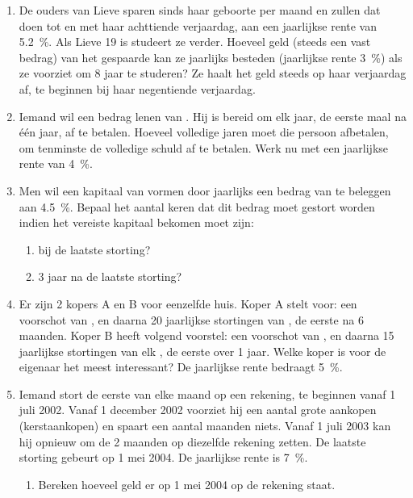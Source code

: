 \begin{enumerate}
   
    \item De ouders van Lieve sparen sinds haar geboorte
     per maand en zullen dat doen tot en met haar
    achttiende verjaardag, aan een jaarlijkse rente van
    \SI{5,2}{\percent}. Als Lieve 19 is studeert ze verder. Hoeveel geld (steeds 
    een vast bedrag) van
    het gespaarde kan ze jaarlijks besteden (jaarlijkse rente \SI{3}{\percent}) als ze  voorziet om 8 jaar te studeren? Ze haalt het geld steeds op haar verjaardag af, te beginnen bij haar negentiende verjaardag.

    \item  Iemand wil een bedrag lenen van . Hij is bereid
   om elk jaar, de eerste maal na \'{e}\'{e}n jaar, 
   af te betalen.
Hoeveel volledige jaren moet die persoon  afbetalen,
       om tenminste de volledige schuld af te betalen. Werk
       nu met een jaarlijkse rente van \SI{4}{\percent}.


    \item Men wil een kapitaal van  vormen door jaarlijks
    een bedrag van  te beleggen aan \SI{4,5}{\percent}. Bepaal het aantal
    keren dat dit bedrag moet gestort worden indien het vereiste
    kapitaal bekomen moet zijn:
    \begin{enumerate}
    \item bij de laatste storting?
    \item 3 jaar na de laatste storting?
    \end{enumerate}

    \item  Er zijn 2 kopers A en B voor eenzelfde huis. Koper A stelt 
    voor:  een voorschot van , en daarna 20 jaarlijkse 
    stortingen van
    , de eerste na 6 maanden. Koper B heeft volgend 
    voorstel: een voorschot van 
    , en daarna 15 jaarlijkse stortingen van elk
    , de eerste over 1 jaar. Welke koper is voor de eigenaar
    het meest interessant? De jaarlijkse rente bedraagt \SI{5}{\percent}.


    \item  Iemand stort de eerste van elke maand  op een
    rekening, te beginnen vanaf 1 juli 2002.  Vanaf 1 december 2002
    voorziet hij een aantal grote aankopen (kerstaankopen) en
    spaart een aantal maanden niets. Vanaf 1 juli 2003 kan hij opnieuw
    om de 2 maanden  op diezelfde rekening zetten. De
    laatste storting gebeurt op 1 mei 2004. De jaarlijkse rente is \SI{7}{\percent}.
    \begin{enumerate}
        \item  Bereken hoeveel geld er op 1 mei 2004 op de rekening
        staat. 


\end{enumerate}
\end{enumerate}
